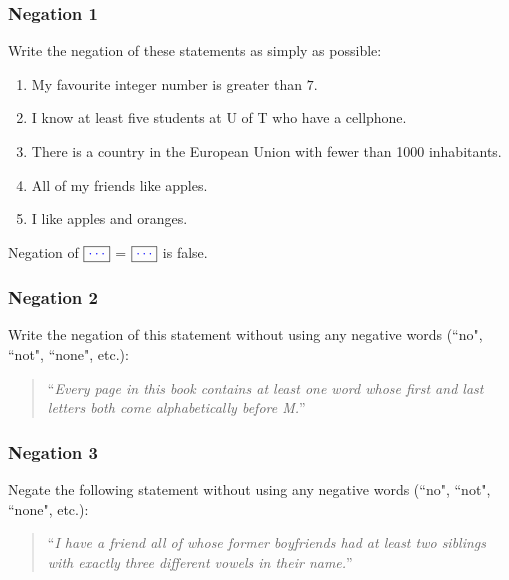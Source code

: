 \documentclass[14pt]{beamer}
\begin{document}
\begin{frame}
	\frametitle{Negation 1}

	Write the negation of these statements as simply as possible:

	\begin{enumerate}
		\item My favourite integer number is greater than $7$.

		\item I know at least five students at U of T who have a cellphone.

		\item There is a country in the European Union with fewer than 1000 inhabitants.

		\item All of my friends like apples.

		\item I like apples and oranges.
	\end{enumerate}

	\vfill

	\begin{center}
		Negation of $\displaystyle \boxed{{\color{blue} \cdots}}$ \; = \; $\displaystyle
		\boxed{{\color{blue} \cdots}}$ is false.
	\end{center}
\end{frame}

\begin{frame}
	\frametitle{Negation 2}

	Write the negation of this statement without using any negative words (``no", ``not",
	``none", etc.):

	\begin{quote}
		``\emph{Every page in this book contains at least one word whose first and
		last letters both come alphabetically before M.}''
	\end{quote}
\end{frame}

\begin{frame}
	\frametitle{Negation 3}

	Negate the following statement without using any negative words (``no", ``not",
	``none", etc.):

	\begin{quote}
		``\emph{I have a friend all of whose former boyfriends had at least two
		siblings with exactly three different vowels in their name.}''
	\end{quote}
\end{frame}
\end{document}
